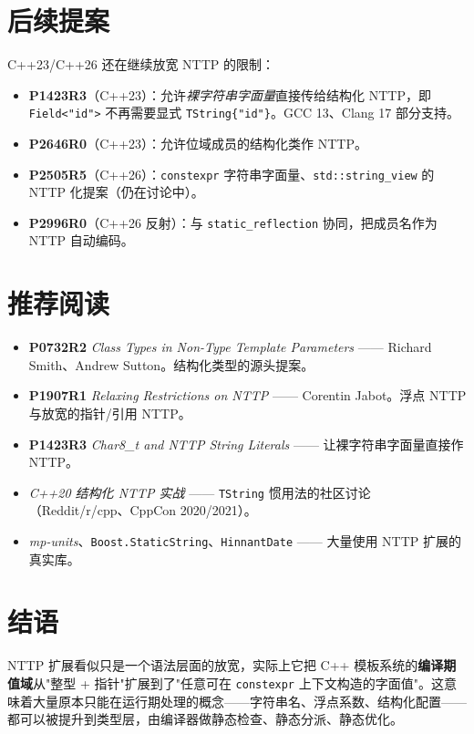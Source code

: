 \documentclass[12pt,a4paper,fontset=fandol]{ctexbook}
\newcommand{\cpp}[1]{C++#1}
\newcommand{\kw}[1]{\texttt{#1}}
\begin{document}
\section{后续提案}

\cpp{23}/\allowbreak{}\cpp{26} 还在继续放宽 NTTP 的限制：

\begin{itemize}
  \item \textbf{P1423R3}（C++23）：允许\emph{裸字符串字面量}直接传给结构化 NTTP，即 \kw{Field<"id">} 不再需要显式 \kw{TString\{"id"\}}。GCC 13、Clang 17 部分支持。
  \item \textbf{P2646R0}（C++23）：允许位域成员的结构化类作 NTTP。
  \item \textbf{P2505R5}（C++26）：\kw{constexpr} 字符串字面量、\kw{std::string\_view} 的 NTTP 化提案（仍在讨论中）。
  \item \textbf{P2996R0}（C++26 反射）：与 \kw{static\_reflection} 协同，把成员名作为 NTTP 自动编码。
\end{itemize}

\section{推荐阅读}

\begin{itemize}
  \item \textbf{P0732R2} \emph{Class Types in Non-Type Template Parameters} —— Richard Smith、Andrew Sutton。结构化类型的源头提案。
  \item \textbf{P1907R1} \emph{Relaxing Restrictions on NTTP} —— Corentin Jabot。浮点 NTTP 与放宽的指针/引用 NTTP。
  \item \textbf{P1423R3} \emph{Char8\_t and NTTP String Literals} —— 让裸字符串字面量直接作 NTTP。
  \item \emph{C++20 结构化 NTTP 实战} —— \kw{TString} 惯用法的社区讨论（Reddit/r/cpp、CppCon 2020/2021）。
  \item \emph{mp-units}、\kw{Boost.StaticString}、\kw{HinnantDate} —— 大量使用 NTTP 扩展的真实库。
\end{itemize}

\section{结语}

NTTP 扩展看似只是一个语法层面的放宽，实际上它把 \cpp{} 模板系统的\textbf{编译期值域}从"整型 + 指针"扩展到了"任意可在 \kw{constexpr} 上下文构造的字面值"。这意味着大量原本只能在运行期处理的概念——字符串名、浮点系数、结构化配置——都可以被提升到类型层，由编译器做静态检查、静态分派、静态优化。
\end{document}
